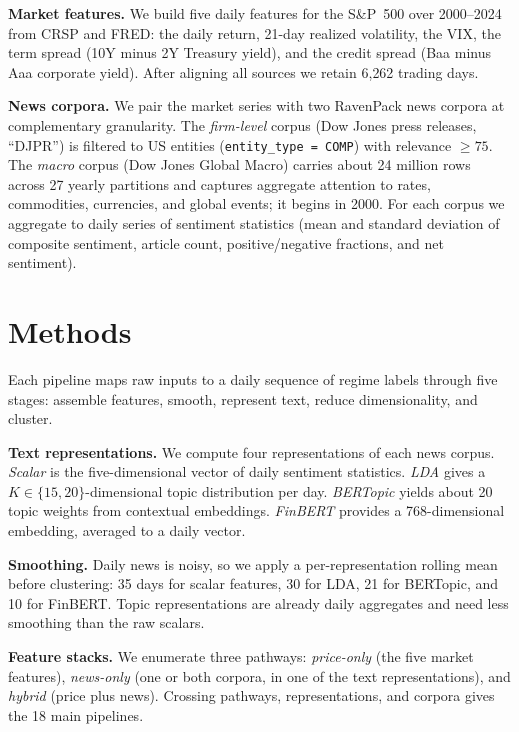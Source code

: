 \documentclass{article} %
\begin{document}
\textbf{Market features.} We build five daily features for the S\&P~500 over
2000--2024 from CRSP and FRED: the daily return, 21-day realized volatility,
the VIX, the term spread (10Y minus 2Y Treasury yield), and the credit spread
(Baa minus Aaa corporate yield). After aligning all sources we retain 6{,}262
trading days.

\textbf{News corpora.} We pair the market series with two RavenPack news
corpora at complementary granularity. The \emph{firm-level} corpus (Dow Jones
press releases, ``DJPR'') is filtered to US entities (\texttt{entity\_type =
COMP}) with relevance $\geq 75$. The \emph{macro} corpus (Dow Jones Global
Macro) carries about 24 million rows across 27 yearly partitions and captures
aggregate attention to rates, commodities, currencies, and global events; it
begins in 2000. For each corpus we aggregate to daily series of sentiment
statistics (mean and standard deviation of composite sentiment, article count,
positive/negative fractions, and net sentiment).

\section{Methods}
\label{sec:methods}

Each pipeline maps raw inputs to a daily sequence of regime labels through five
stages: assemble features, smooth, represent text, reduce dimensionality, and
cluster.

\textbf{Text representations.} We compute four representations of each news
corpus. \emph{Scalar} is the five-dimensional vector of daily sentiment
statistics. \emph{LDA} \citep{blei2003} gives a $K\in\{15,20\}$-dimensional
topic distribution per day. \emph{BERTopic} \citep{grootendorst2022} yields
about 20 topic weights from contextual embeddings. \emph{FinBERT}
\citep{araci2019} provides a 768-dimensional embedding, averaged to a daily
vector.

\textbf{Smoothing.} Daily news is noisy, so we apply a per-representation
rolling mean before clustering: 35 days for scalar features, 30 for LDA, 21 for
BERTopic, and 10 for FinBERT. Topic representations are already daily
aggregates and need less smoothing than the raw scalars.

\textbf{Feature stacks.} We enumerate three pathways: \emph{price-only} (the
five market features), \emph{news-only} (one or both corpora, in one of the
text representations), and \emph{hybrid} (price plus news). Crossing pathways,
representations, and corpora gives the 18 main pipelines.
\end{document}
